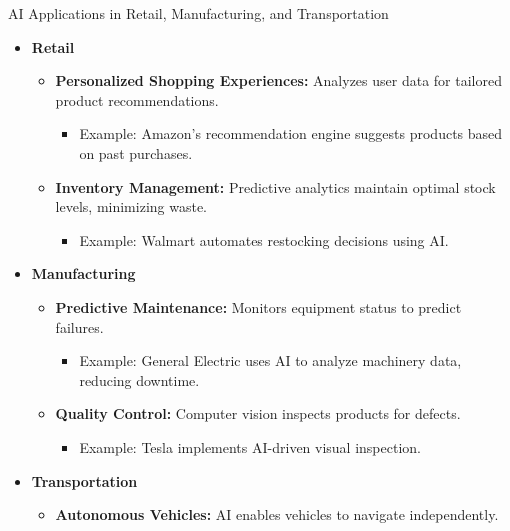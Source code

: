 \documentclass[aspectratio=169]{beamer}
\begin{document}
\begin{frame}[fragile]{AI Applications in Retail, Manufacturing, and Transportation}
    \begin{itemize}
        \item \textbf{Retail}
            \begin{itemize}
                \item \textbf{Personalized Shopping Experiences:} Analyzes user data for tailored product recommendations.
                    \begin{itemize}
                        \item Example: Amazon’s recommendation engine suggests products based on past purchases.
                    \end{itemize}
                \item \textbf{Inventory Management:} Predictive analytics maintain optimal stock levels, minimizing waste.
                    \begin{itemize}
                        \item Example: Walmart automates restocking decisions using AI.
                    \end{itemize}
            \end{itemize}
        \item \textbf{Manufacturing}
            \begin{itemize}
                \item \textbf{Predictive Maintenance:} Monitors equipment status to predict failures.
                    \begin{itemize}
                        \item Example: General Electric uses AI to analyze machinery data, reducing downtime.
                    \end{itemize}
                \item \textbf{Quality Control:} Computer vision inspects products for defects.
                    \begin{itemize}
                        \item Example: Tesla implements AI-driven visual inspection.
                    \end{itemize}
            \end{itemize}
        \item \textbf{Transportation}
            \begin{itemize}
                \item \textbf{Autonomous Vehicles:} AI enables vehicles to navigate independently.

\end{itemize}
\end{itemize}
\end{frame}
\end{document}
